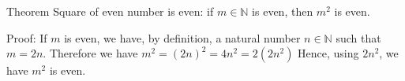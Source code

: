 Theorem Square of even number is even: 
if $m \in \mathbb{N}$ is even, then $m^2$ is even.


Proof:
If $m$ is even, we have, by definition, a natural number $n \in \mathbb{N}$ such that $m = 2n$.
Therefore we have $m^2 = (2n)^2 = 4n^2 = 2(2n^2)$
Hence, using $2n^2$, we have $m^2$ is even.
